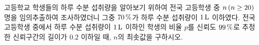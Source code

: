 고등학교 학생들의 하루 수분 섭취량을 알아보기 위하여 전국 고등학생 중 $n\mkern3mu (n\ge 20)$명을 임의추출하여 조사하였더니 그중 $70\mkern3mu \%$가 하루 수분 섭취량이 $1\mkern3mu \mathrm{L}$ 이하였다. 전국 고등학생 중에서 하루 수분 섭취량이 $1\mkern3mu \mathrm{L}$ 이하인 학생의 비율 $p$를 신뢰도 $99\mkern3mu \%$로 추정한 신뢰구간의 길이가 $0.2$ 이하일 때, \mbox{$n$의} 최솟값을 구하시오. 

